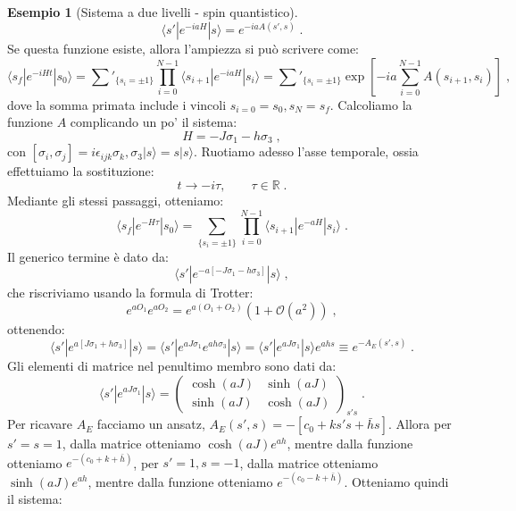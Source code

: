\documentclass[12pt,a4paper]{article}
\theoremstyle{definition}
\newtheorem{exm}{Esempio}
\numberwithin{equation}{section}
\newcommand{\bra}{\langle}
\newcommand{\ket}{\rangle}
\begin{document}
\begin{exm}[Sistema a due livelli - spin quantistico]
\begin{equation}
\bra s'|e^{-iaH}|s\ket=e^{-iaA(s',s)}\;.
\end{equation}
Se questa funzione esiste, allora l'ampiezza si può scrivere come:
\begin{equation}
\bra s_f|e^{-iHt}|s_0\ket=\sum'_{\{s_i=\pm 1\}}\prod_{i=0}^{N-1}\bra s_{i+1}|e^{-iaH}|s_i\ket=\sum'_{\{s_i=\pm 1\}}\exp\left[-ia\sum_{i=0}^{N-1}A(s_{i+1},s_i)\right]\;,
\end{equation}
dove la somma primata include i vincoli $s_{i=0}=s_0,s_N=s_f$. Calcoliamo la funzione $A$ complicando un po' il sistema:
\begin{equation}
H=-J\sigma_1-h\sigma_3\;,
\end{equation}
con $[\sigma_i,\sigma_j]=i\epsilon_{ijk}\sigma_k, \sigma_3|s\ket=s|s\ket$. Ruotiamo adesso l'asse temporale, ossia effettuiamo la sostituzione:
\begin{equation}
t\longrightarrow -i\tau, \qquad \tau\in\mathbb{R}\;.
\end{equation}
Mediante gli stessi passaggi, otteniamo:
\begin{equation}
\bra s_f|e^{-H\tau}|s_0\ket=\sum_{\{s_i=\pm 1\}}\prod_{i=0}^{N-1}\bra s_{i+1}|e^{-aH}|s_i\ket\;.
\end{equation}
Il generico termine è dato da:
\begin{equation*}
\bra s'|e^{-a[-J\sigma_1-h\sigma_3]}|s\ket\;,
\end{equation*}
che riscriviamo usando la formula di Trotter:
\begin{equation*}
e^{aO_1}e^{aO_2}=e^{a(O_1+O_2)}\left(1+\mathcal{O}(a^2)\right)\;,
\end{equation*}
ottenendo:
\begin{equation}
\bra s'|e^{a[J\sigma_1+h\sigma_3]}|s\ket=\bra s'|e^{aJ\sigma_1}e^{ah\sigma_3}|s\ket=\bra s'|e^{aJ\sigma_1}|s\ket e^{ahs}\equiv e^{-A_E(s',s)}\;.
\end{equation}
Gli elementi di matrice nel penultimo membro sono dati da:
\begin{equation}
\bra s'|e^{aJ\sigma_1}|s\ket=\left(\begin{matrix}
\cosh(aJ) & \sinh(aJ) \\
\sinh(aJ) & \cosh(aJ)
\end{matrix}\right)_{s's}\;.
\end{equation}
Per ricavare $A_E$ facciamo un ansatz, $A_E(s',s)=-[c_0+ks's+\bar{h}s]$. Allora per $s'=s=1$, dalla matrice otteniamo $\cosh(aJ)e^{ah}$, mentre dalla funzione otteniamo $e^{-(c_0+k+\bar{h})}$, per $s'=1,s=-1$, dalla matrice otteniamo $\sinh(aJ)e^{ah}$, mentre dalla funzione otteniamo $e^{-(c_0-k+\bar{h})}$. Otteniamo quindi il sistema:

\end{exm}
\end{document}
